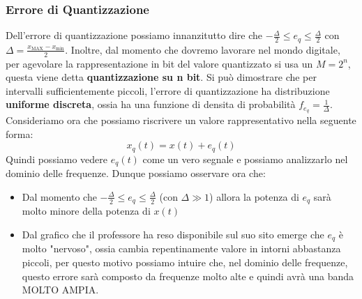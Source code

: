 \subsubsection{Errore di Quantizzazione}
Dell'errore di quantizzazione possiamo innanzitutto dire che $-\frac{\Delta}{2} \leq e_q \leq \frac{\Delta}{2}$ con $\Delta = \frac{x_\text{MAX} - x_\text{min}}{2} $.
Inoltre, dal momento che dovremo lavorare nel mondo digitale, per agevolare la rappresentazione in bit del valore quantizzato si usa
un $M = 2^n$, questa viene detta \textbf{quantizzazione su n bit}.
Si può dimostrare che per intervalli sufficientemente piccoli, l'errore di quantizzazione ha distribuzione \textbf{uniforme discreta}, ossia 
ha una funzione di densita di probabilità $f_{e_q} = \frac{1}{\Delta}$. Consideriamo ora che possiamo riscrivere un valore rappresentativo nella seguente forma:
\begin{equation}
    x_q(t) = x(t) + e_q(t)
\end{equation}
Quindi possiamo vedere $e_q(t)$ come un vero segnale e possiamo analizzarlo nel dominio delle frequenze. Dunque possiamo osservare ora che:
\begin{itemize}
    \item Dal momento che $-\frac{\Delta}{2} \leq e_q \leq \frac{\Delta}{2}$ (con $\Delta \gg 1$) allora la potenza di $e_q$ sarà molto minore della potenza di $x(t)$
    \item Dal grafico che il professore ha reso disponibile sul suo sito emerge che $e_q$ è molto "nervoso", ossia cambia repentinamente valore in intorni abbastanza piccoli,
    per questo motivo possiamo intuire che, nel dominio delle frequenze, questo errore sarà composto da frequenze molto alte e quindi avrà una banda MOLTO AMPIA.
\end{itemize}

